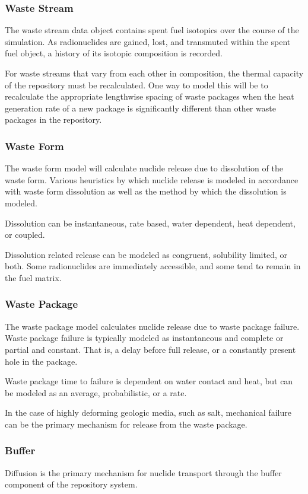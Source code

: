 \subsubsection{Waste Stream}

The waste stream data object contains spent fuel isotopics over the 
course of the simulation. As radionuclides are gained, lost, and transmuted within 
the spent fuel object, a history of its isotopic composition is recorded.

For waste streams that vary from each other in composition, the thermal capacity 
of the repository must be recalculated. One way to model this will be to 
recalculate the appropriate lengthwise spacing of waste packages when the heat 
generation rate of a new package is significantly different than other waste 
packages in the repository. 

\subsubsection{Waste Form}
The waste form model will calculate nuclide release due to dissolution 
of the waste form. Various heuristics by which nuclide release is modeled in 
accordance with waste form dissolution as well as the method by which 
the dissolution is modeled.

Dissolution can be instantaneous, rate based, water dependent, heat 
dependent, or coupled.

Dissolution related release can be modeled as congruent, solubility 
limited, or both. Some radionuclides are immediately accessible, and some 
tend to remain in the fuel matrix. 

\subsubsection{Waste Package}
The waste package model calculates nuclide release due to waste 
package failure. Waste package failure is typically modeled as 
instantaneous and complete or partial and constant. That is, a delay 
before full release, or a constantly present hole in the package.

Waste package time to failure is dependent on water contact and heat, 
but can be modeled as an average, probabilistic, or a rate.

In the case of highly deforming geologic media, such as salt, 
mechanical failure can be the primary mechanism for release from the 
waste package.

\subsubsection{Buffer}
Diffusion is the primary mechanism for nuclide transport through the 
buffer component of the repository system.  

